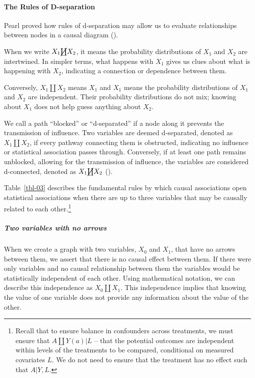\documentclass[
  singlecolumn]{article}
\let\oldparagraph\paragraph
\renewcommand{\paragraph}[1]{\oldparagraph{#1}\mbox{}}
\let\oldsubparagraph\subparagraph
\renewcommand{\subparagraph}[1]{\oldsubparagraph{#1}\mbox{}}
\begin{document}
\paragraph{The Rules of D-separation}\label{the-rules-of-d-separation}

Pearl proved how rules of d-separation may allow us to evaluate
relationships between nodes in a causal diagram
().

When we write \(X_1 \cancel\coprod X_2\), it means the probability
distributions of \(X_1\) and \(X_2\) are intertwined. In simpler terms,
what happens with \(X_1\) gives us clues about what is happening with
\(X_2\), indicating a connection or dependence between them.

Conversely, \(X_1 \coprod X_2\) means \(X_1\) and \(X_1\) means the
probability distributions of \(X_1\) and \(X_2\) are independent. Their
probability distributions do not mix; knowing about \(X_1\) does not
help guess anything about \(X_2\).

We call a path ``blocked'' or ``d-separated'' if a node along it
prevents the transmission of influence. Two variables are deemed
d-separated, denoted as \(X_1 \coprod X_2\), if every pathway connecting
them is obstructed, indicating no influence or statistical association
passes through. Conversely, if at least one path remains unblocked,
allowing for the transmission of influence, the variables are considered
d-connected, denoted as \(X_1 \cancel\coprod X_2\)
().

Table~\ref{tbl-03} describes the fundamental rules by which causal
associations open statistical associations when there are up to three
variables that may be causally related to each other.\footnote{Recall
  that to ensure balance in confounders across treatments, we must
  ensure that \(A\coprod Y(a)|L\) -- that the potential outcomes are
  independent within levels of the treatments to be compared,
  conditional on measured covariates \(L\). We do not need to ensure
  that the treatment has no effect such that \(A|Y,L\).}

\subparagraph{\texorpdfstring{\textbf{Two variables with no
arrows}}{Two variables with no arrows}}\label{two-variables-with-no-arrows}

When we create a graph with two variables, \(X_0\) and \(X_1\), that
have no arrows between them, we assert that there is no causal effect
between them. If there were only variables and no causal relationship
between them the variables would be statistically independent of each
other. Using mathematical notation, we can describe this independence as
\(X_0 \coprod X_1\). This independence implies that knowing the value of
one variable does not provide any information about the value of the
other.
\end{document}
